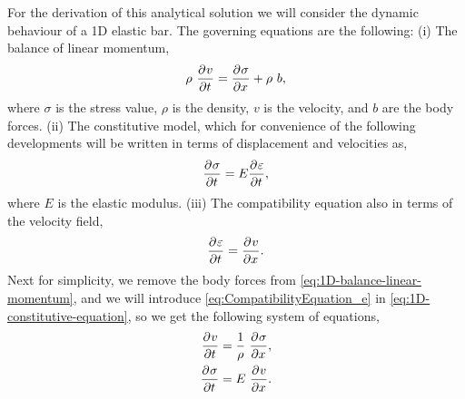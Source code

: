 For the derivation of this analytical solution we will consider  the
dynamic behaviour of a 1D elastic bar. The governing equations are the
following: (i) The balance of linear momentum,
\begin{equation}
  \label{eq:1D-balance-linear-momentum}
  \rho\ \frac{\partial^{}{v}}{ \partial {t}^{} } = \frac{\partial^{}{\sigma}}{ \partial {x}^{} } + \rho\ b,
\end{equation}
where $\sigma$ is the stress value, $\rho$ is the density,
$v$ is the velocity, and $b$ are the body
forces. (ii) The constitutive model, which for convenience of the
following developments will be written in terms of displacement and
velocities as, 
\begin{equation}
  \label{eq:1D-constitutive-equation}
  \frac{\partial^{}{\sigma}}{ \partial {t}^{} } = E \frac{\partial^{}{\varepsilon}}{ \partial {t}^{} },
\end{equation}
where $E$ is the elastic modulus. (iii) The compatibility equation
also in terms of the velocity field,
\begin{equation}
  \label{eq:CompatibilityEquation_e}
  \frac{\partial^{}{\varepsilon}}{ \partial {t}^{} } = \frac{\partial^{}{v}}{ \partial {x}^{} }.
\end{equation}
Next for simplicity, we remove the body forces from
\eqref{eq:1D-balance-linear-momentum}, and we will introduce
\eqref{eq:CompatibilityEquation_e} in
\eqref{eq:1D-constitutive-equation}, so we get the following system of equations,
\begin{align}
  \label{eq:1D-balance-linear-momentum-II}
  \frac{\partial^{}{v}}{ \partial {t}^{} } &= \frac{1}{\rho}\ \frac{\partial^{}{\sigma}}{ \partial {x}^{} }, \\
  \label{eq:1D-constitutive-equation-II}
  \frac{\partial^{}{\sigma}}{ \partial {t}^{} } &= E\ \frac{\partial^{}{v}}{ \partial {x}^{} }.
\end{align}

